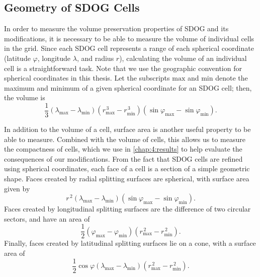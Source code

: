 \subsection{Geometry of SDOG Cells} \label{chap:4:geom}
In order to measure the volume preservation properties of SDOG and its modifications, it is necessary to be able to measure the volume of individual cells in the grid.
Since each SDOG cell represents a range of each spherical coordinate (latitude $\varphi$, longitude $\lambda$, and radius $r$), calculating the volume of an individual cell is a straightforward task.
Note that we use the geographic convention for spherical coordinates in this thesis.
Let the subscripts $\mathrm{max}$ and $\mathrm{min}$ denote the maximum and minimum of a given spherical coordinate for an SDOG cell; then, the volume is \cite{yu2009sdog}
%
\begin{equation} \label{eq:volume}
\frac{1}{3} \left( \lambda_\mathrm{max} - \lambda_\mathrm{min} \right) \left(r_\mathrm{max}^{\,3} - r_\mathrm{min}^{\,3} \right) \left(\sin\varphi_\mathrm{max} - \sin\varphi_\mathrm{min} \right).
\end{equation}


In addition to the volume of a cell, surface area is another useful property to be able to measure.
Combined with the volume of cells, this allows us to measure the compactness of cells, which we use in \cref{chap:4:results} to help evaluate the consequences of our modifications.
From the fact that SDOG cells are refined using spherical coordinates, each face of a cell is a section of a simple geometric shape.
Faces created by radial splitting surfaces are spherical, with surface area given by
%
\begin{equation*}
r^{\,2} \left( \lambda_\mathrm{max} - \lambda_\mathrm{min} \right) \left( \sin\varphi_\mathrm{max} - \sin\varphi_\mathrm{min} \right).
\end{equation*}
%
Faces created by longitudinal splitting surfaces are the difference of two circular sectors, and have an area of
%
\begin{equation*}
\frac{1}{2} \left( \varphi_\mathrm{max} - \varphi_\mathrm{min} \right) \left( r_\mathrm{max}^{\,2} - r_\mathrm{min}^{\,2} \right).
\end{equation*}
%
Finally, faces created by latitudinal splitting surfaces lie on a cone, with a surface area of
%
\begin{equation*}
\frac{1}{2} \cos\varphi \left( \lambda_\mathrm{max} - \lambda_\mathrm{min} \right) \left( r_\mathrm{max}^{\,2} - r_\mathrm{min}^{\,2} \right).
\end{equation*}


